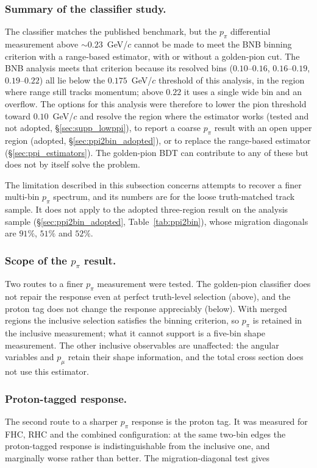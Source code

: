 \documentclass[11pt,a4paper]{article}
\begin{document}
\subsubsection{Summary of the classifier study.} The classifier matches the published
benchmark, but the $p_\pi$ differential measurement above $\sim\!0.23$~GeV/$c$ cannot be made
to meet the BNB binning criterion with a range-based estimator, with or without a
golden-pion cut. The BNB analysis meets that criterion because its resolved bins
($0.10$--$0.16$, $0.16$--$0.19$, $0.19$--$0.22$) all lie below the $0.175$~GeV/$c$
threshold of this analysis, in the region where range still tracks momentum; above $0.22$ it
uses a single wide bin and an overflow. The options for this analysis were therefore to lower
the pion threshold toward $0.10$~GeV/$c$ and resolve the region where the estimator works (tested
and not adopted, \S\ref{sec:supp_lowppi}), to report a coarse $p_\pi$ result with an open upper
region (adopted, \S\ref{sec:ppi2bin_adopted}), or to replace the range-based estimator
(\S\ref{sec:ppi_estimators}). The golden-pion BDT can contribute to any of these but does
not by itself solve the problem.

The limitation described in this subsection concerns attempts to recover a finer multi-bin $p_\pi$
spectrum, and its numbers are for the loose truth-matched track sample. It does not apply to the
adopted three-region result on the analysis sample (\S\ref{sec:ppi2bin_adopted},
Table~\ref{tab:ppi2bin}), whose migration diagonals are $91\%$, $51\%$ and $52\%$.

\subsubsection{Scope of the $p_\pi$ result.} Two routes to a finer $p_\pi$ measurement were
tested. The golden-pion classifier does not repair the response even at perfect truth-level
selection (above), and the proton tag does not change the response appreciably
(below). With merged regions the
inclusive selection satisfies the binning criterion, so $p_\pi$ is retained in the
inclusive measurement; what it cannot support is a five-bin shape measurement.
The other inclusive observables are unaffected: the angular variables and $p_\mu$ retain
their shape information, and the total cross section does not use this estimator.

\subsubsection{Proton-tagged response.} The second route to a sharper $p_\pi$
response is the proton tag. It was measured for FHC, RHC and the combined configuration:
at the same two-bin edges the proton-tagged response is indistinguishable from the
inclusive one, and marginally worse rather than better. The migration-diagonal
test gives
\end{document}
